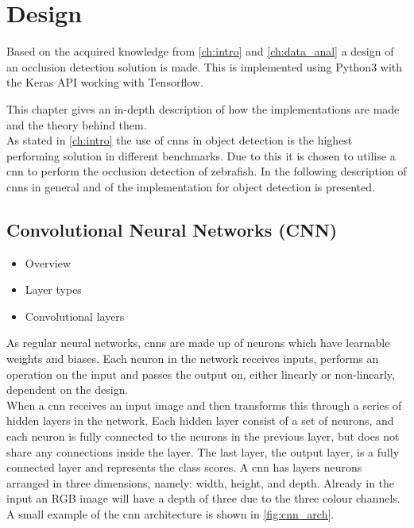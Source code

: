\graphicspath{{figures/design/}}
\chapter{Design}\label{ch:design}
Based on the acquired knowledge from \autoref{ch:intro} and \autoref{ch:data_anal} a design of an occlusion detection solution is made. This is implemented using Python3 with the Keras API working with Tensorflow.

This chapter gives an in-depth description of how the implementations are made and the theory behind them.\\

As stated in \autoref{ch:intro} the use of \gls{cnn}s in object detection is the highest performing solution in different benchmarks. Due to this it is chosen to utilise a \gls{cnn} to perform the occlusion detection of zebrafish. In the following description of \gls{cnn}s in general and of the implementation for object detection is presented.

\section{Convolutional Neural Networks (CNN)}
\begin{itemize}
	\item Overview
	\item Layer types
	\item Convolutional layers
\end{itemize}

As regular neural networks, \gls{cnn}s are made up of neurons which have learnable weights and biases. Each neuron in the network receives inputs, performs an operation on the input and passes the output on, either linearly or non-linearly, dependent on the design.\\

When a \gls{cnn} receives an input image and then transforms this through a series of hidden layers in the network. Each hidden layer consist of a set of neurons, and each neuron is fully connected to the neurons in the previous layer, but does not share any connections inside the layer. The last layer, the output layer, is a fully connected layer and represents the class scores. A \gls{cnn} has layers neurons arranged in three dimensions, namely: width, height, and depth. Already in the input an RGB image will have a depth of three due to the three colour channels. A small example of the \gls{cnn} architecture is shown in \autoref{fig:cnn_arch}.

